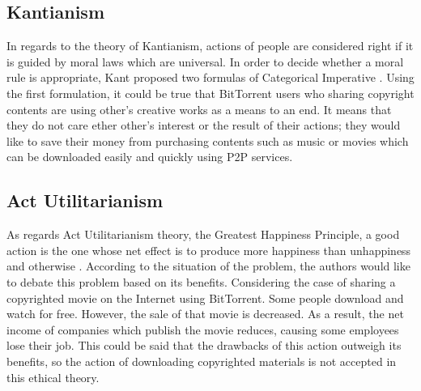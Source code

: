\documentclass[conference]{IEEEtran}
\begin{document}
\subsection{Kantianism}
In regards to the theory of Kantianism, actions of people are considered right if it is guided by moral laws which are universal. In order to decide whether a moral rule is appropriate, Kant proposed two formulas of Categorical Imperative \cite{quinn2014ethics}. Using the first formulation, it could be true that BitTorrent users who sharing copyright contents are using other's creative works as a means to an end. It means that they do not care ether other's interest or the result of their actions; they would like to save their money from purchasing contents such as music or movies which can be downloaded easily and quickly using P2P services. 

\subsection{Act Utilitarianism}
As regards Act Utilitarianism theory, the Greatest Happiness Principle, a good action is the one whose net effect is to produce more happiness than unhappiness and otherwise \cite{quinn2014ethics}. According to the situation of the problem, the authors would like to debate this problem based on its benefits. Considering the case of sharing a copyrighted movie on the Internet using BitTorrent. Some people download and watch for free. However, the sale of that movie is decreased. As a result, the net income of companies which publish the movie reduces, causing some employees lose their job. This could be said that the drawbacks of this action outweigh its benefits, so the action of downloading copyrighted materials is not accepted in this ethical theory.
\end{document}
